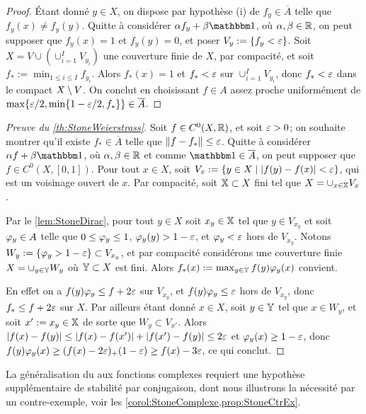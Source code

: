 \begin{proof}
	Étant donné $y \in X$, on dispose par hypothèse (i) de $f_y\in \overline A$ telle que $f_y(x) \neq f_y(y)$. Quitte à considérer $\alpha f_y + \beta\bbone$, où $\alpha,\beta \in \mathbb{R}$, on peut supposer que $f_y(x)=1$ et $f_y(y) = 0$, et poser $V_y := \{f_y < \varepsilon\}$. 
	Soit $X = V \cup (\cup_{i=1}^I V_{y_i})$ une couverture finie de $X$, par compacité, et soit $f_* := \min_{1 \leq i \leq I} f_{y_i}$. Alors $f_*(x)=1$ et $f_* < \varepsilon$ sur $\cup_{i=1}^I V_{y_i}$, donc $f_* < \varepsilon$ dans le compact $X \setminus V$. 
	On conclut en choisissant $f \in A$ assez proche uniformément de $\max\{\varepsilon/2, \min\{1-\varepsilon/2, f_*\}\} \in \overline A$. 
\end{proof}

\begin{proof}[Preuve du \cref{th:StoneWeierstrass}]
Soit $f \in C^0(X, \mathbb{R})$, et soit $\varepsilon>0$; on souhaite montrer qu'il existe $f_* \in \overline A$ telle que $\|f-f_*\| \leq \varepsilon$.  Quitte à considérer $\alpha f+ \beta \bbone$, où $\alpha,\beta \in \mathbb{R}$ et comme $\bbone \in \overline A$, on peut supposer que $f \in C^0(X,[0,1])$.
Pour tout $x \in X$, soit $V_x := \{y \in X \mid |f(y)-f(x)|< \varepsilon\}$, qui est un voisinage ouvert de $x$. Par compacité, soit $\mathbb{X}\subset X$ fini tel que $X = \cup_{x\in \mathbb{X}} V_x$.


Par le \cref{lem:StoneDirac}, pour tout $y \in X$ soit $x_y \in \mathbb{X}$ tel que $y \in V_{x_y}$ et soit $\varphi_y \in A$ telle que $0 \leq \varphi_y \leq 1$, $\varphi_y(y)>1-\varepsilon$, et $\varphi_y < \varepsilon$ hors de $V_{x_y}$. Notons $W_y := \{\varphi_y>1-\varepsilon\} \subset V_{x_y}$, et par compacité considérons une couverture finie $X = \cup_{y \in \mathbb{Y}} W_y$ où $\mathbb{Y} \subset X$ est fini.
Alors $f_*(x) := \max_{y \in \mathbb{Y}} f(y) \varphi_{y}(x)$ convient. 

En effet on a $f(y) \varphi_{y} \leq f+2\varepsilon$ sur $V_{x_y}$, et $f(y) \varphi_y\leq \varepsilon$ hors de $V_{x_y}$, donc $f_* \leq f+2 \varepsilon$ sur $X$. 
Par ailleurs étant donné $x\in X$, soit $y \in \mathbb{Y}$ tel que $x \in W_y$, et soit $x':= x_y \in \mathbb{X}$ de sorte que $W_y \subset V_{x'}$. Alors $|f(x)-f(y)| \leq |f(x)-f(x')| + |f(x')-f(y)| \leq 2 \varepsilon$ et $\varphi_y(x) \geq 1-\varepsilon$, donc $f(y) \varphi_{y}(x) \geq (f(x)-2 \varepsilon)_+(1-\varepsilon) \geq f(x)-3 \varepsilon$, ce qui conclut. 
\end{proof}

La généralisation du  aux fonctions complexes requiert une hypothèse supplémentaire de stabilité par conjugaison, dont nous illustrons la nécessité par un contre-exemple, voir les \cref{corol:StoneComplexe,prop:StoneCtrEx}.

